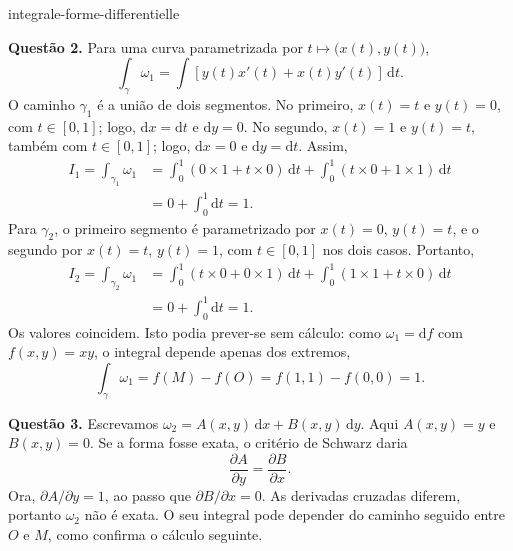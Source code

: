 \begin{exo}{integrale-forme-differentielle}
\begin{solution}
\textbf{Questão 2.} Para uma curva parametrizada por $t\mapsto\bigl(x(t),y(t)\bigr)$,
\[\int_\gamma\omega_1=\int\left[y(t)x'(t)+x(t)y'(t)\right]\,\mathrm{d}t.\]
O caminho $\gamma_1$ é a união de dois segmentos. No primeiro, $x(t)=t$ e
$y(t)=0$, com $t\in[0,1]$; logo, $\mathrm{d}x=\mathrm{d}t$ e $\mathrm{d}y=0$.
No segundo, $x(t)=1$ e $y(t)=t$, também com $t\in[0,1]$; logo,
$\mathrm{d}x=0$ e $\mathrm{d}y=\mathrm{d}t$. Assim,
\[
\begin{aligned}I_1=\int_{\gamma_1}\omega_1
&=\int_0^1(0\times1+t\times0)\,\mathrm{d}t+\int_0^1(t\times0+1\times1)\,\mathrm{d}t\\
&=0+\int_0^1\mathrm{d}t=1.\end{aligned}
\]
Para $\gamma_2$, o primeiro segmento é parametrizado por $x(t)=0$, $y(t)=t$,
e o segundo por $x(t)=t$, $y(t)=1$, com $t\in[0,1]$ nos dois casos. Portanto,
\[
\begin{aligned}I_2=\int_{\gamma_2}\omega_1
&=\int_0^1(t\times0+0\times1)\,\mathrm{d}t+\int_0^1(1\times1+t\times0)\,\mathrm{d}t\\
&=0+\int_0^1\mathrm{d}t=1.\end{aligned}
\]
Os valores coincidem. Isto podia prever-se sem cálculo: como
$\omega_1=\mathrm{d}f$ com $f(x,y)=xy$, o integral depende apenas dos extremos,
\[\int_\gamma\omega_1=f(M)-f(O)=f(1,1)-f(0,0)=1.\]

\textbf{Questão 3.} Escrevamos $\omega_2=A(x,y)\,\mathrm{d}x+B(x,y)\,\mathrm{d}y$.
Aqui $A(x,y)=y$ e $B(x,y)=0$. Se a forma fosse exata, o critério de Schwarz daria
\[\frac{\partial A}{\partial y}=\frac{\partial B}{\partial x}.\]
Ora, $\partial A/\partial y=1$, ao passo que $\partial B/\partial x=0$. As
derivadas cruzadas diferem, portanto $\omega_2$ não é exata. O seu integral
pode depender do caminho seguido entre $O$ e $M$, como confirma o cálculo seguinte.


\end{solution}
\end{exo}
